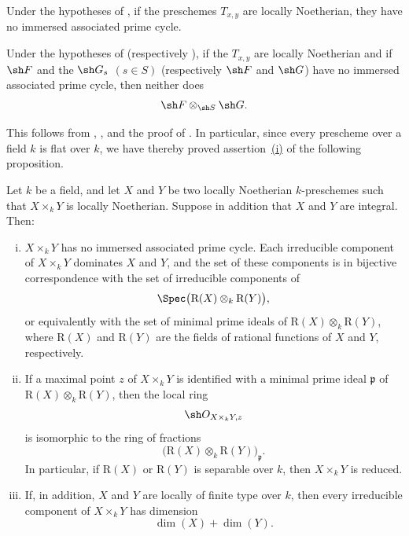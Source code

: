 \begin{corollary}[4.2.2]
\label{IV.4.2.2}
Under the hypotheses of , if the preschemes
$T_{x,y}$ are locally Noetherian, they have no immersed associated
prime cycle.
\end{corollary}

\begin{corollary}[4.2.3]
\label{IV.4.2.3}
Under the hypotheses of 
(respectively ), if the $T_{x,y}$ are locally Noetherian
and if $\sh F$ and the $\sh G_s$ $(s\in S)$
(respectively $\sh F$ and $\sh G$) have no immersed associated prime
cycle, then neither does
\[
\sh F\otimes_{\sh S}\sh G.
\]
\end{corollary}

This follows from , , and the proof of
.
In particular, since every prescheme over a field $k$ is flat over $k$,
we have thereby proved assertion~\hyperref[IV.4.2.4.i]{(i)} of the
following proposition.

\begin{proposition}[4.2.4]
\label{IV.4.2.4}
Let $k$ be a field, and let $X$ and $Y$ be two locally Noetherian
$k$-preschemes such that $X\times_k Y$ is locally Noetherian.
Suppose in addition that $X$ and $Y$ are integral.
Then:
\begin{enumerate}[(i)]
\item
{}
\label{IV.4.2.4.i}
$X\times_k Y$ has no immersed associated prime cycle.
Each irreducible component of $X\times_k Y$ dominates $X$ and $Y$, and
the set of these components is in bijective correspondence with the set
of irreducible components of
\[
\Spec\bigl(\mathrm R(X)\otimes_k\mathrm R(Y)\bigr),
\]
or equivalently with the set of minimal prime ideals of
$\mathrm R(X)\otimes_k\mathrm R(Y)$, where $\mathrm R(X)$ and
$\mathrm R(Y)$ are the fields of rational functions of $X$ and $Y$,
respectively.

\item
{}
\label{IV.4.2.4.ii}
If a maximal point $z$ of $X\times_k Y$ is identified with a minimal
prime ideal $\mathfrak p$ of
$\mathrm R(X)\otimes_k\mathrm R(Y)$, then the local ring
\[
\sh O_{X\times_k Y,z}
\]
is isomorphic to the ring of fractions
\[
\bigl(\mathrm R(X)\otimes_k\mathrm R(Y)\bigr)_{\mathfrak p}.
\]
In particular, if $\mathrm R(X)$ or $\mathrm R(Y)$ is separable over
$k$, then $X\times_k Y$ is reduced.


\item
{}
\label{IV.4.2.4.iii}
If, in addition, $X$ and $Y$ are locally of finite type over $k$, then
every irreducible component of $X\times_k Y$ has dimension
\[
\dim(X)+\dim(Y).
\]
\end{enumerate}
\end{proposition}


